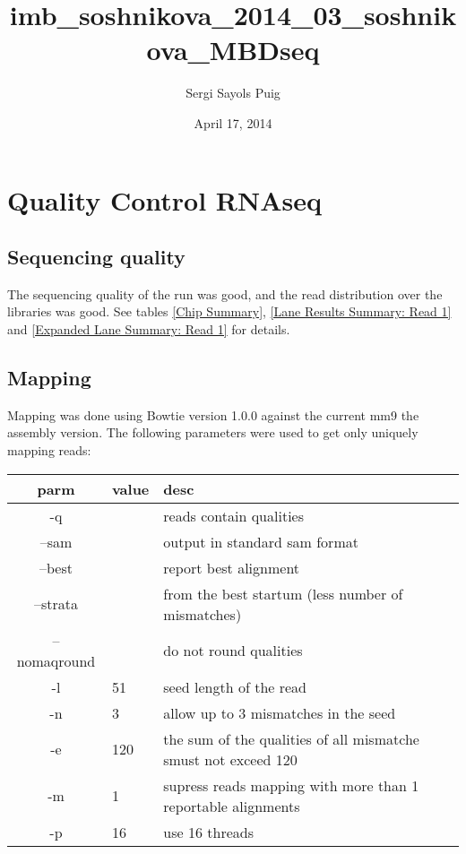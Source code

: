 \documentclass[a4paper,10pt]{article}
\title{imb\_soshnikova\_2014\_03\_soshnikova\_MBDseq}
\author{Sergi Sayols Puig}
\date{April 17, 2014}
\begin{document}
\maketitle

\section{Quality Control RNAseq}

\subsection{Sequencing quality}
The sequencing quality of the run was good, and the read distribution over the libraries was good. See tables \ref{Chip Summary}, \ref{Lane Results Summary: Read 1} and \ref{Expanded Lane Summary: Read 1} for details. 



\subsection{Mapping}
Mapping was done using Bowtie version 1.0.0 against the current mm9 the assembly version. The following parameters were used to get only uniquely mapping reads:

{\tiny
\begin{table}[h!]
\begin{tabular}{cll}\hline
	parm & value & desc\\\hline
	-q & & reads contain qualities\\
	--sam  & & output in standard sam format\\
	--best & & report best alignment\\
	--strata & & from the best startum (less number of mismatches)\\
	--nomaqround & & do not round qualities\\
	-l & 51 & seed length of the read\\
	-n & 3 & allow up to 3 mismatches in the seed\\
	-e & 120 & the sum of the qualities of all mismatche smust not exceed 120\\
	-m & 1 & supress reads mapping with more than 1 reportable alignments\\
	-p & 16 & use 16 threads \\\hline
\end{tabular}
\end{table}}
\end{document}
